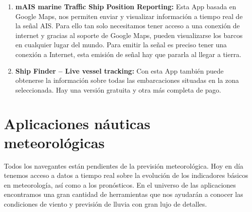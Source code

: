 \begin{enumerate}
\item \textbf{mAIS marine Traffic Ship Position Reporting:} Esta App
  basada en Google Maps, nos permiten enviar y visualizar información
  a tiempo real de la señal AIS. Para ello tan solo necesitamos tener
  acceso a una conexión de internet y gracias al soporte de Google
  Maps, pueden visualizarse los barcos en cualquier lugar del
  mundo. Para emitir la señal es preciso tener una conexión a
  Internet, esta emisión de señal hay que pararla al llegar a tierra.
\item \textbf{Ship Finder – Live vessel tracking:} Con esta App
  también puede obtenerse la información sobre todas las embarcaciones
  situadas en la zona seleccionada. Hay una versión gratuita y otra
  más completa de pago.
\end{enumerate}

\section{Aplicaciones náuticas meteorológicas}

Todos los navegantes están pendientes de la previsión
meteorológica. Hoy en día tenemos acceso a datos a tiempo real sobre
la evolución de los indicadores básicos en meteorología, así como a
los pronósticos. En el universo de las aplicaciones encontramos una
gran cantidad de herramientas que nos ayudarán a conocer las
condiciones de viento y previsión de lluvia con gran lujo de detalles.

